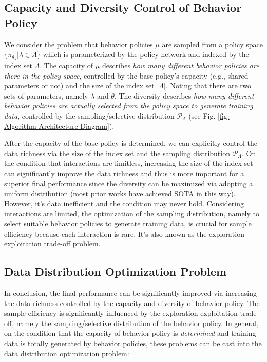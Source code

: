 \subsection{Capacity and Diversity  Control of Behavior Policy} 
\label{sec: Explicit  Capacity and Diversity  Control of Behavior Policy}

We consider the problem that behavior policies $\mu$ are sampled from a policy space $\{\pi_{\theta_{\lambda}} | \lambda \in \Lambda\}$ which is parameterized by the policy network and indexed by the index set $\Lambda$.
The capacity of $\mu$ describes \emph{how many different behavior policies are there in the policy space}, controlled by the base policy's capacity (e.g., shared parameters or not) and the size of the index set $|\Lambda|$. Noting that there are two sets of parameters, namely $\lambda$ and $\theta$. The diversity describes \emph{how many different behavior policies are actually selected from the policy space to generate training data}, controlled by the sampling/selective distribution $\mathcal{P}_\Lambda$ (see Fig. \ref{fig: Algorithm Architecture Diagram}). 
 
After the capacity of the base policy is determined, we can explicitly control the data richness via the size of the index set and the sampling distribution $\mathcal{P}_\Lambda$. On the condition that  interactions are limitless, increasing the size  of the index set can significantly improve the data richness and thus is more important for a superior final performance since the diversity can be maximized via adopting a uniform distribution (most prior works have achieved SOTA in this way). However, it's data inefficient and the condition may never hold. Considering interactions are limited, the optimization of the sampling distribution, namely to select suitable behavior policies to generate training data, is crucial for sample efficiency because each interaction is rare. It's also known as the exploration-exploitation trade-off problem.

\subsection{Data Distribution Optimization Problem}
\label{sec: Data Distribution Optimization Problem}

In conclusion, the final performance can be significantly improved via increasing the data richness controlled by  the capacity and diversity of behavior policy. The sample efficiency is significantly influenced by the exploration-exploitation trade-off, namely the sampling/selective distribution  of the behavior policy. In general, on the condition that the capacity of behavior policy is \emph{determined} and training data is totally generated by behavior policies, these problems can be cast into  the data distribution optimization problem:

